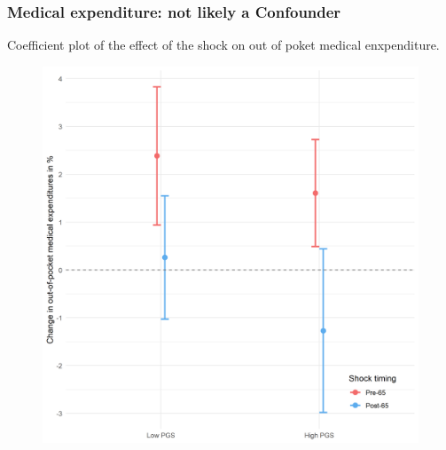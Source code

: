 \documentclass[10pt,compress,xcolor=dvipsnames,aspectratio=169]{beamer}    %
\newcounter{ex}
\newcommand{\1}[1]{\mathrm{1\hspace*{-2.5pt}l}[#1]}	%
\begin{document}
\begin{frame}
\frametitle{Medical expenditure: not likely a Confounder}
Coefficient plot of the effect of the shock on out of poket medical enxpenditure.
\begin{figure}[hbtp]
\centering
\includegraphics[height=0.8\textheight]{../../3_output/shock_effects/medexp_6070_100_cvplot.png}
\label{fig:medexp}
\end{figure}
\end{frame}

\end{document}
